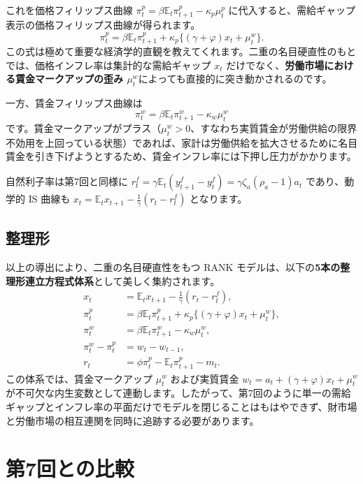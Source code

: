\documentclass[
  japanese,
  lualatex,
  ja=standard,
  12pt,
  a4paper]{ltjsarticle}
\begin{document}
これを価格フィリップス曲線
\(\pi_t^p = \beta\mathbb{E}_t\pi_{t+1}^p - \kappa_p \mu_t^p\)
に代入すると、需給ギャップ表示の価格フィリップス曲線が得られます。 \[
\pi^p_t
=
\beta\mathbb{E}_t\pi^p_{t+1}
+
\kappa_p\{(\gamma+\varphi)x_t+\mu^w_t\}.
\]
この式は極めて重要な経済学的直観を教えてくれます。二重の名目硬直性のもとでは、価格インフレ率は集計的な需給ギャップ
\(x_t\) だけでなく、\textbf{労働市場における賃金マークアップの歪み
\(\mu_t^w\)}によっても直接的に突き動かされるのです。

一方、賃金フィリップス曲線は \[
\pi^w_t
=
\beta\mathbb{E}_t\pi^w_{t+1}
-
\kappa_w\mu^w_t
\]
です。賃金マークアップがプラス（\(\mu_t^w>0\)、すなわち実質賃金が労働供給の限界不効用を上回っている状態）であれば、家計は労働供給を拡大させるために名目賃金を引き下げようとするため、賃金インフレ率には下押し圧力がかかります。

自然利子率は第7回と同様に
\(r_t^f = \gamma\mathbb{E}_t(y^f_{t+1}-y^f_t) = \gamma\zeta_a(\rho_a-1)a_t\)
であり、動学的 IS 曲線も
\(x_t = \mathbb{E}_t x_{t+1} - \frac{1}{\gamma}(r_t-r_t^f)\)
となります。

\subsection{整理形}\label{ux6574ux7406ux5f62}

以上の導出により、二重の名目硬直性をもつ RANK
モデルは、以下の\textbf{5本の整理形連立方程式体系}として美しく集約されます。
\[
\begin{aligned}
x_t
&=
\mathbb{E}_t x_{t+1}
-
\frac{1}{\gamma}(r_t-r_t^f),
\\
\pi^p_t
&=
\beta\mathbb{E}_t\pi^p_{t+1}
+
\kappa_p\{(\gamma+\varphi)x_t+\mu^w_t\},
\\
\pi^w_t
&=
\beta\mathbb{E}_t\pi^w_{t+1}
-
\kappa_w\mu^w_t,
\\
\pi^w_t-\pi^p_t
&=
w_t-w_{t-1},
\\
r_t
&=
\phi\pi^p_t
-
\mathbb{E}_t\pi^p_{t+1}
-
m_t.
\end{aligned}
\] この体系では、賃金マークアップ \(\mu_t^w\) および実質賃金
\(w_t = a_t + (\gamma+\varphi)x_t + \mu_t^w\)
が不可欠な内生変数として連動します。したがって、第7回のように単一の需給ギャップとインフレ率の平面だけでモデルを閉じることはもはやできず、財市場と労働市場の相互連関を同時に追跡する必要があります。

\section{第7回との比較}\label{ux7b2c7ux56deux3068ux306eux6bd4ux8f03}
\end{document}
